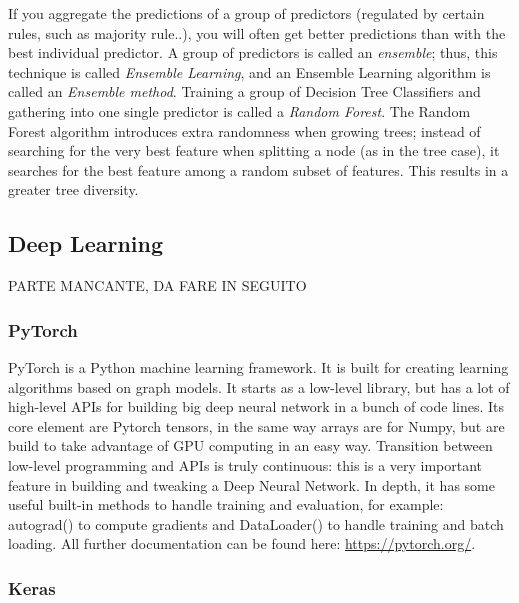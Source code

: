 \documentclass{article}
\begin{document}
If you aggregate the predictions of a group of predictors (regulated by certain rules, such as majority rule..), you will often get better predictions than with the best individual predictor. A group of predictors is called an \textit{ensemble}; thus, this technique is called \textit{Ensemble Learning}, and an Ensemble Learning algorithm is called an \textit{Ensemble method}.
Training a group of Decision Tree Classifiers and gathering into one single predictor is called a \textit{Random Forest}.
The Random Forest algorithm introduces extra randomness when growing trees; instead of searching for the very best feature when splitting a node (as in the tree case), it searches for the best feature among a random subset of features. This results in a greater tree diversity.



\subsection{Deep Learning}

PARTE MANCANTE, DA FARE IN SEGUITO

\subsubsection{PyTorch}

PyTorch is a Python machine learning framework. It is built for creating learning algorithms based on graph models. 
It starts as a low-level library, but has a lot of high-level APIs for building big deep neural network in a bunch of code lines.
Its core element are Pytorch tensors, in the same way arrays are for Numpy, but are build to take advantage of GPU computing in an easy way.
Transition between low-level programming and APIs is truly continuous: this is a very important feature in building and tweaking a Deep Neural Network.
In depth, it has some useful built-in methods to handle training and evaluation, for example: autograd() to compute gradients and DataLoader() to handle training and batch loading.
All further documentation can be found here: \url{https://pytorch.org/}.

\subsubsection{Keras}
\end{document}
